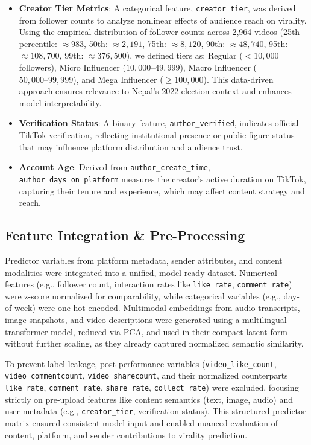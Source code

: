 \documentclass[12pt,a4paper]{report}
\begin{document}
\begin{itemize}
    \item \textbf{Creator Tier Metrics}: A categorical feature, \texttt{creator\_tier}, was derived from follower counts to analyze nonlinear effects of audience reach on virality. Using the empirical distribution of follower counts across 2,964 videos (25th percentile: $\approx 983$, 50th: $\approx 2,191$, 75th: $\approx 8,120$, 90th: $\approx 48,740$, 95th: $\approx 108,700$, 99th: $\approx 376,500$), we defined tiers as: Regular ($< 10,000$ followers), Micro Influencer ($10,000–49,999$), Macro Influencer ($50,000–99,999$), and Mega Influencer ($\geq 100,000$). This data-driven approach ensures relevance to Nepal’s 2022 election context and enhances model interpretability.
    
    \item \textbf{Verification Status}: A binary feature, \texttt{author\_verified}, indicates official TikTok verification, reflecting institutional presence or public figure status that may influence platform distribution and audience trust.
    
    \item \textbf{Account Age}: Derived from \texttt{author\_create\_time}, \texttt{author\_days\_on\_platform} measures the creator’s active duration on TikTok, capturing their tenure and experience, which may affect content strategy and reach.
\end{itemize}
\newpage
\subsection{Feature Integration \& Pre-Processing}

Predictor variables from platform metadata, sender attributes, and content modalities were integrated into a unified, model-ready dataset. Numerical features (e.g., follower count, interaction rates like \texttt{like\_rate}, \texttt{comment\_rate}) were z-score normalized for comparability, while categorical variables (e.g., day-of-week) were one-hot encoded. Multimodal embeddings from audio transcripts, image snapshots, and video descriptions were generated using a multilingual transformer model, reduced via PCA, and used in their compact latent form without further scaling, as they already captured normalized semantic similarity.

To prevent label leakage, post-performance variables (\texttt{video\_like\_count}, \texttt{video\_commentcount}, \texttt{video\_sharecount}, and their normalized counterparts \texttt{like\_rate}, \texttt{comment\_rate}, \texttt{share\_rate}, \texttt{collect\_rate}) were excluded, focusing strictly on pre-upload features like content semantics (text, image, audio) and user metadata (e.g., \texttt{creator\_tier}, verification status). This structured predictor matrix ensured consistent model input and enabled nuanced evaluation of content, platform, and sender contributions to virality prediction.
\end{document}
